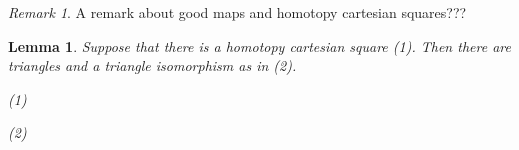 \documentclass[12pt]{article}
\newtheorem{lemma}[theorem]{Lemma}
\theoremstyle{definition}
\theoremstyle{remark}
\newtheorem*{remark}{Remark}
\begin{document}
            \begin{remark}
                A remark about good maps and homotopy cartesian squares???
            \end{remark}

            \begin{lemma}
                Suppose that there is a homotopy cartesian square (1). Then there are triangles and a triangle isomorphism as in (2).
                \begin{center}
                    (1)
                    (2)
                \end{center}
            \end{lemma}
\end{document}
